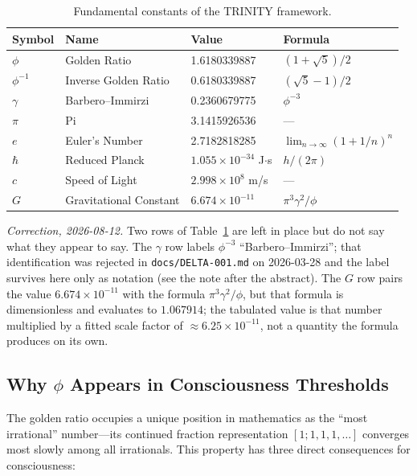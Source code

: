 \documentclass[12pt,a4paper]{article}
\begin{document}
\begin{table}[h!]
\centering
\caption{Fundamental constants of the TRINITY framework.}
\label{tab:constants}
\begin{tabular}{@{}llll@{}}
\toprule
\textbf{Symbol} & \textbf{Name} & \textbf{Value} & \textbf{Formula} \\
\midrule
$\phi$ & Golden Ratio & 1.6180339887 & $(1+\sqrt{5})/2$ \\
$\phi^{-1}$ & Inverse Golden Ratio & 0.6180339887 & $(\sqrt{5}-1)/2$ \\
$\gamma$ & Barbero--Immirzi & 0.2360679775 & $\phi^{-3}$ \\
$\pi$ & Pi & 3.1415926536 & --- \\
$e$ & Euler's Number & 2.7182818285 & $\lim_{n\to\infty}(1+1/n)^n$ \\
$\hbar$ & Reduced Planck & $1.055 \times 10^{-34}$ J$\cdot$s & $h/(2\pi)$ \\
$c$ & Speed of Light & $2.998 \times 10^{8}$ m/s & --- \\
$G$ & Gravitational Constant & $6.674 \times 10^{-11}$ & $\pi^3 \gamma^2 / \phi$ \\
\bottomrule
\end{tabular}
\end{table}

\noindent
\emph{Correction, 2026-08-12.} Two rows of Table~\ref{tab:constants} are left in
place but do not say what they appear to say. The $\gamma$ row labels
$\phi^{-3}$ ``Barbero--Immirzi''; that identification was rejected in
\texttt{docs/DELTA-001.md} on 2026-03-28 and the label survives here only as
notation (see the note after the abstract). The $G$ row pairs the value
$6.674\times10^{-11}$ with the formula $\pi^3\gamma^2/\phi$, but that formula is
dimensionless and evaluates to $1.067914$; the tabulated value is that number
multiplied by a fitted scale factor of $\approx 6.25\times10^{-11}$, not a
quantity the formula produces on its own.

\subsection{Why $\phi$ Appears in Consciousness Thresholds}

The golden ratio occupies a unique position in mathematics as the ``most
irrational'' number---its continued fraction representation $[1;1,1,1,\ldots]$
converges most slowly among all irrationals. This property has three direct
consequences for consciousness:
\end{document}
